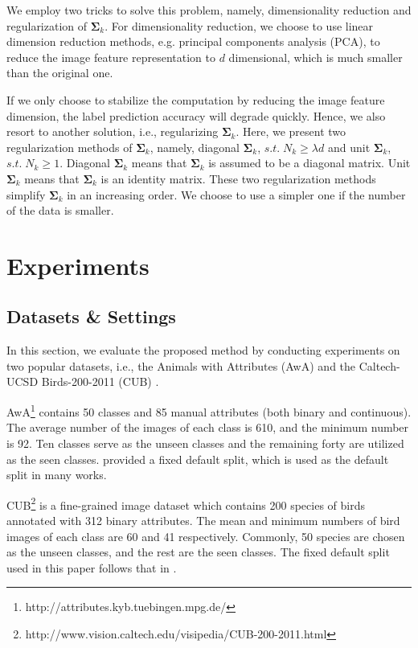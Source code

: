 \documentclass{article}
\begin{document}
We employ two tricks to solve this problem, namely, dimensionality reduction and regularization of $\bm{\Sigma}_k$. For dimensionality reduction, we choose to use linear dimension reduction methods, e.g. principal components analysis (PCA), to reduce the image feature representation to $d$ dimensional, which is much smaller than the original one.

If we only choose to stabilize the computation by reducing the image feature dimension, the label prediction accuracy will degrade quickly. Hence,  we also resort to another solution, i.e., regularizing $\bm{\Sigma}_k$. Here, we present two regularization methods of $\bm{\Sigma}_k$, namely, diagonal $\bm{\Sigma}_k$, $s.t. \; N_k \geq \lambda d$ and unit $\bm{\Sigma}_k$, $s.t. \; N_k \geq 1$. Diagonal $\bm{\Sigma}_k$ means that $\bm{\Sigma}_k$ is assumed to be a diagonal matrix. Unit $\bm{\Sigma}_k$ means that $\bm{\Sigma}_k$ is an identity matrix. These two regularization methods simplify $\bm{\Sigma}_k$ in an increasing order. We choose to use a simpler one if the number of the data is smaller.


\section{Experiments}
\subsection{Datasets \& Settings}
In this section, we evaluate the proposed method by conducting experiments on two popular datasets, i.e., the Animals with Attributes (AwA) \cite{lampert2009learning} and the Caltech-UCSD Birds-200-2011 (CUB) \cite{WahCUB_200_2011}.

AwA\footnote{http://attributes.kyb.tuebingen.mpg.de/} contains 50 classes and 85 manual attributes (both binary and continuous). The average number of the images of each class is 610, and the minimum number is 92. Ten classes serve as the unseen classes and the remaining forty are utilized as the seen classes. \cite{lampert2014attribute} provided a fixed default split, which is used as the default split in many works.

CUB\footnote{http://www.vision.caltech.edu/visipedia/CUB-200-2011.html} is a fine-grained image dataset which contains 200 species of birds annotated with 312 binary attributes.  The mean and minimum numbers of bird images of each class are 60 and 41 respectively. Commonly, 50 species are chosen as the unseen classes, and the rest are the seen classes. The fixed default split used in this paper follows that in \cite{wang2016relational}.
\end{document}
